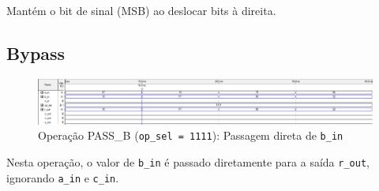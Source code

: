 Mantém o bit de sinal (MSB) ao deslocar bits à direita.

\subsection{Bypass}

\begin{figure}[H]
\centering
\includegraphics[width=\textwidth]{images/alu_1111.png}
\caption{Operação PASS\_B (\texttt{op\_sel = 1111}): Passagem direta de \texttt{b\_in}}
\end{figure}

Nesta operação, o valor de \texttt{b\_in} é passado diretamente para a saída \texttt{r\_out}, ignorando \texttt{a\_in} e \texttt{c\_in}.